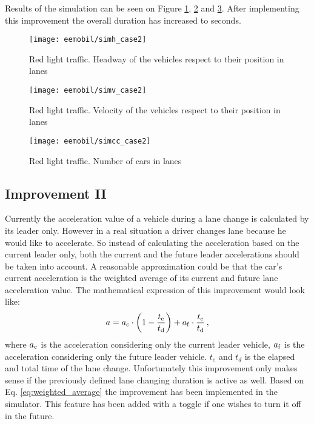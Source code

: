 		Results of the simulation can be seen on Figure \ref{fig:red_light_situationh_impr1}, \ref{fig:red_light_situationv_impr1} and \ref{fig:red_light_situationcc_impr1}. After implementing this improvement the overall duration has increased to seconds.
		\begin{figure}
			\centering
			\texttt{[image: eemobil/simh\_case2]}
			\caption{Red light traffic. Headway of the vehicles respect to their position in lanes}
			\label{fig:red_light_situationh_impr1}
		\end{figure}
		\begin{figure}
			\centering
			\texttt{[image: eemobil/simv\_case2]}
			\caption{Red light traffic. Velocity of the vehicles respect to their position in lanes}
			\label{fig:red_light_situationv_impr1}
		\end{figure}
		\begin{figure}
			\centering
			\texttt{[image: eemobil/simcc\_case2]}
			\caption{Red light traffic. Number of cars in lanes }
			\label{fig:red_light_situationcc_impr1}
		\end{figure}
		\subsection{Improvement II}
		Currently the acceleration value of a vehicle during a lane change is calculated by its leader only. However in a real situation a driver changes lane because he would like to accelerate. So instead of calculating the acceleration based on the current leader only, both the current and the future leader accelerations should be taken into account. A reasonable approximation could be that the car's current acceleration is the weighted average of its current and future lane acceleration value. The mathematical expression of this improvement would look like:
		\begin{equation}
			a=a_{\rm c} \cdot \left(1-\frac{t_{\rm e}}{t_{\rm d}}\right) + a_{\rm f}\cdot \frac{t_{\rm e}}{t_{\rm d}}\,,
			\label{eq:weighted_average}
		\end{equation}
		where $a_{\rm c}$ is the acceleration considering only the current leader vehicle, $a_{\rm f}$ is the acceleration considering only the future leader vehicle. $t_e$ and $t_d$ is the elapsed and total time of the lane change. Unfortunately this improvement only makes sense if the previously defined lane changing duration is active as well. Based on Eq. \eqref{eq:weighted_average} the improvement has been implemented in the simulator. This feature has been added with a toggle if one wishes to turn it off in the future.
		
